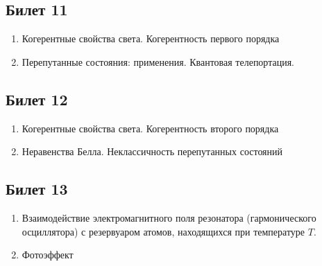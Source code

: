\documentclass[12pt,a4paper]{article}
\begin{document}
\subsection*{Билет 11} 
\begin{enumerate}
\item Когерентные свойства света. Когерентность первого порядка
\item Перепутанные состояния: применения. Квантовая
  телепортация.
\end{enumerate}

\subsection*{Билет 12} 
\begin{enumerate}
\item Когерентные свойства света. Когерентность второго порядка
\item Неравенства Белла. Неклассичность перепутанных состояний
\end{enumerate}

\subsection*{Билет 13} 
\begin{enumerate}
\item Взаимодействие электромагнитного поля резонатора
  (гармонического осциллятора) с резервуаром атомов, находящихся при
  температуре $T$. 
\item Фотоэффект
\end{enumerate}
\end{document}
